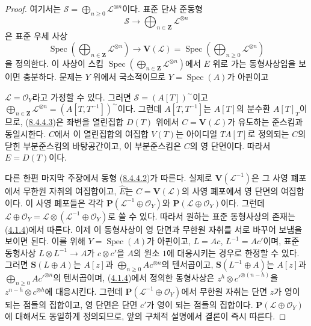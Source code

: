 \begin{proof}
여기서는
$\mathcal{S}=\bigoplus_{n\geq0}\mathcal{L}^{\otimes n}$이다. 표준 단사 준동형
\[
  \mathcal{S}\to\bigoplus_{n\in\mathbf{Z}}\mathcal{L}^{\otimes n}
\]
은 표준 우세 사상
\begin{equation}
\label{II.8.4.4.3-ko}
  \operatorname{Spec}\left(
    \bigoplus_{n\in\mathbf{Z}}\mathcal{L}^{\otimes n}
  \right)
  \to\mathbf{V}(\mathcal{L})
  =\operatorname{Spec}\left(
    \bigoplus_{n\geq0}\mathcal{L}^{\otimes n}
  \right)
\tag{8.4.4.3}
\end{equation}
을 정의한다. 이 사상이 스킴
$\operatorname{Spec}(\bigoplus_{n\in\mathbf{Z}}\mathcal{L}^{\otimes n})$에서
$E$ 위로 가는 동형사상임을 보이면 충분하다. 문제는
$Y$ 위에서 국소적이므로 $Y=\operatorname{Spec}(A)$가 아핀이고

$\mathcal{L}=\mathcal{O}_Y$라고 가정할 수 있다. 그러면
$\mathcal{S}=(A[T])^{\sim}$이고
$\bigoplus_{n\in\mathbf{Z}}\mathcal{L}^{\otimes n}
=(A[T,T^{-1}])^{\sim}$이다. 그런데 $A[T,T^{-1}]$는 $A[T]$의
분수환 $A[T]_T$이므로, (\hyperref[II.8.4.4.3-ko]{8.4.4.3})은
좌변을 열린집합 $D(T)$ 위에서
$C=\mathbf{V}(\mathcal{L})$가 유도하는 준스킴과 동일시한다. $C$에서
이 열린집합의 여집합 $V(T)$는 아이디얼 $TA[T]$로 정의되는
$C$의 닫힌 부분준스킴의 바탕공간이고, 이 부분준스킴은
$C$의 영 단면이다. 따라서 $E=D(T)$이다.

다른 한편 마지막 주장에서 동형
(\hyperref[II.8.4.4.2-ko]{8.4.4.2})가 따른다. 실제로
$\mathbf{V}(\mathcal{L}^{-1})$은 그 사영 폐포에서 무한원 자취의
여집합이고, $\widehat{E}$는
$C=\mathbf{V}(\mathcal{L})$의 사영 폐포에서 영 단면의 여집합이다.
이 사영 폐포들은 각각
$\mathbf{P}(\mathcal{L}^{-1}\oplus\mathcal{O}_Y)$와
$\mathbf{P}(\mathcal{L}\oplus\mathcal{O}_Y)$이다. 그런데
$\mathcal{L}\oplus\mathcal{O}_Y
=\mathcal{L}\otimes(\mathcal{L}^{-1}\oplus\mathcal{O}_Y)$로 쓸 수 있다.
따라서 원하는 표준 동형사상의 존재는
(\hyperref[II.4.1.4-ko]{4.1.4})에서 따른다. 이제 이 동형사상이
영 단면과 무한원 자취를 서로 바꾸어 보냄을 보이면 된다. 이를 위해
$Y=\operatorname{Spec}(A)$가 아핀이고,
$L=Ac$, $L^{-1}=Ac'$이며, 표준 동형사상
$L\otimes L^{-1}\to A$가 $c\otimes c'$을 $A$의 원소 $1$에
대응시키는 경우로 한정할 수 있다. 그러면
$\mathbf{S}(L\oplus A)$는 $A[z]$과
$\bigoplus_{n\geq0}Ac^{\otimes n}$의 텐서곱이고,
$\mathbf{S}(L^{-1}\oplus A)$는 $A[z]$과
$\bigoplus_{n\geq0}Ac'^{\otimes n}$의 텐서곱이며,
(\hyperref[II.4.1.4-ko]{4.1.4})에서 정의한 동형사상은
$z^h\otimes c'^{\otimes(n-h)}$을
$z^{n-h}\otimes c^{\otimes h}$에 대응시킨다. 그런데
$\mathbf{P}(\mathcal{L}^{-1}\oplus\mathcal{O}_Y)$에서 무한원 자취는
단면 $z$가 영이 되는 점들의 집합이고, 영 단면은 단면
$c'$가 영이 되는 점들의 집합이다.
$\mathbf{P}(\mathcal{L}\oplus\mathcal{O}_Y)$에 대해서도 동일하게 정의되므로,
앞의 구체적 설명에서 결론이 즉시 따른다.
\end{proof}

